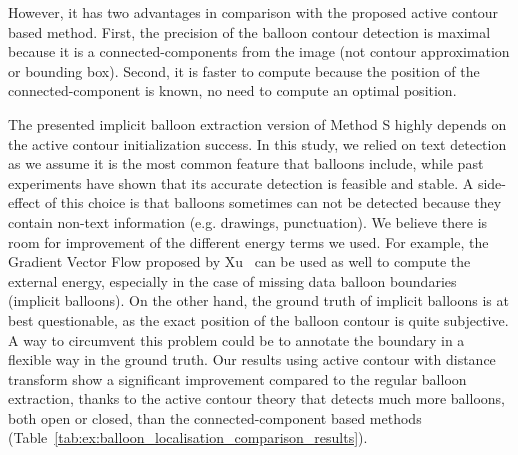 However, it has two advantages in comparison with the proposed active contour based method.
First, the precision of the balloon contour detection is maximal because it is a connected-components from the image (not contour approximation or bounding box).
Second, it is faster to compute because the position of the connected-component is known, no need to compute an optimal position.

The presented implicit balloon extraction version of Method S highly depends on the active contour initialization success.
In this study, we relied on text detection as we assume it is the most common feature that balloons include, while past experiments have shown that its accurate detection is feasible and stable.
A side-effect of this choice is that balloons sometimes can not be detected because they contain non-text information (e.g. drawings, punctuation).
We believe there is room for improvement of the different energy terms we used.
For example, the Gradient Vector Flow proposed by Xu~\cite{Xu1998} can be used as well to compute the external energy, especially in the case of missing data balloon boundaries (implicit balloons).
On the other hand, the ground truth of implicit balloons is at best questionable, as the exact position of the balloon contour is quite subjective.
A way to circumvent this problem could be to annotate the boundary in a flexible way in the ground truth.
Our results using active contour with distance transform show a significant improvement compared to the regular balloon extraction, thanks to the active contour theory that detects much more balloons, both open or closed, than the connected-component based methods (Table~\ref{tab:ex:balloon_localisation_comparison_results}).


